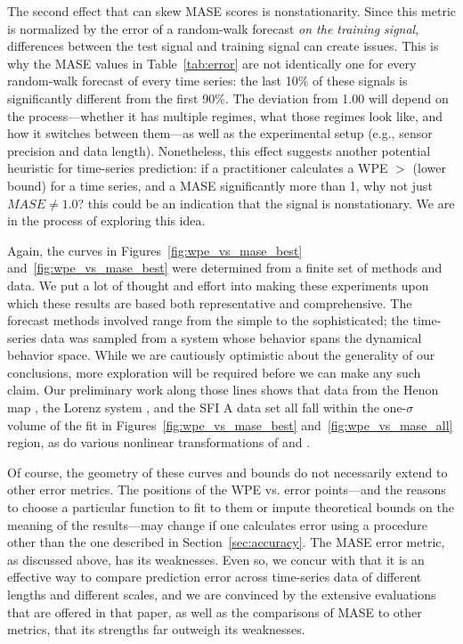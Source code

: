 
The second effect that can skew MASE scores is nonstationarity.  Since
this metric is normalized by the error of a random-walk forecast
\emph{on the training signal}, differences between the test signal and
training signal can create issues.  This is why the MASE values in
Table~\ref{tab:error} are not identically one for every random-walk
forecast of every time series: the last 10\% of these signals is
significantly different from the first 90\%.  The deviation from 1.00
will depend on the process---whether it has multiple regimes, what
those regimes look like, and how it switches between them---as well as
the experimental setup (e.g., sensor precision and data length).
Nonetheless, this effect suggests another potential heuristic for
time-series prediction: if a practitioner calculates a WPE $>$
\alert{(lower bound)} for a time series, and a MASE significantly more
than 1, \alert{why not just $MASE \neq 1.0$?}  this could be an
indication that the signal is nonstationary.  We are in the process of
exploring this idea.

Again, the curves in Figures~\ref{fig:wpe_vs_mase_best}
and~\ref{fig:wpe_vs_mase_best} were determined from a finite set of
methods and data.  We put a lot of thought and effort into making
these experiments upon which these results are based both
representative and comprehensive.  The forecast methods involved range
from the simple to the sophisticated; the time-series data was sampled
from a system whose behavior spans the dynamical behavior space.
While we are cautiously optimistic about the generality of our
conclusions, more exploration will be required before we can make any
such claim.  Our preliminary work along those lines shows that data
from the Henon map \cite{henon}, the Lorenz system \cite{lorenz}, and
the SFI A data set \cite{sfi-data} all fall within the one-$\sigma$
volume of the fit in Figures~\ref{fig:wpe_vs_mase_best}
and~\ref{fig:wpe_vs_mase_all} region, as do various nonlinear
transformations of \svdtwo and \svdsix.

Of course, the geometry of these curves and bounds do not necessarily
extend to other error metrics.  The positions of the WPE vs. error
points---and the reasons to choose a particular function to fit to
them or impute theoretical bounds on the meaning of the results---may
change if one calculates error using a procedure other than the one
described in Section~\ref{sec:accuracy}.  The MASE error metric, as
discussed above, has its weaknesses.  Even so, we concur with
\cite{MASE} that it is an effective way to compare prediction error
across time-series data of different lengths and different scales, and
we are convinced by the extensive evaluations that are offered in that
paper, as well as the comparisons of MASE to other metrics, that its
strengths far outweigh its weaknesses.

